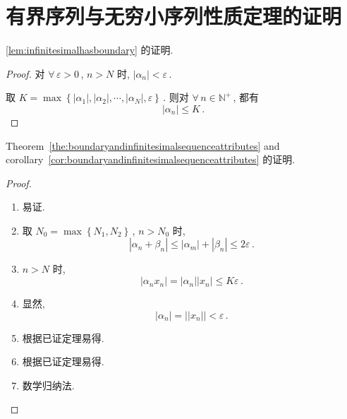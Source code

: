 \documentclass{book}
\newcommand{\Any}{\forall\,}
\newcommand{\set}[1]{\left\{#1\right\}}
\newcommand{\abs}[1]{\left\lvert #1 \right\rvert}
\newcommand{\N}{\mathbb{N}}
\renewcommand{\le}{\leqslant}
\numberwithin{equation}{section}
\numberwithin{figure}{section}
\theoremstyle{definition}
\begin{document}
\section{有界序列与无穷小序列性质定理的证明}
\label{proof:boundaryandinfinitesimalsequenceattributes}
\cref{lem:infinitesimalhasboundary} 的证明.
\begin{proof}
  对 $\Any \varepsilon>0$\,, $n>N$ 时, $\abs{\alpha_n}<\varepsilon$\,.

  取 $K=\max\set{\abs{\alpha_1},\abs{\alpha_2},\cdots,\abs{\alpha_N},\varepsilon}$\,.
  则对 $\Any n\in\N^+$\,, 都有
  \begin{equation*}
    \abs{\alpha_n}\le K\,.
  \end{equation*}
\end{proof}

Theorem~\ref{the:boundaryandinfinitesimalsequenceattributes} and corollary~\ref{cor:boundaryandinfinitesimalsequenceattributes} 的证明.
\begin{proof}
  \leavevmode

  \begin{enumerate}
    \item 易证.
    \item 取 $N_0=\max\set{N_1,N_2}$\,, $n>N_0$ 时,
      \begin{equation*}
	\abs{\alpha_n+\beta_n}\le\abs{\alpha_m}+\abs{\beta_n}\le2\varepsilon\,.
      \end{equation*}
    \item $n>N$ 时,
      \begin{equation*}
	\abs{\alpha_nx_n}=\abs{\alpha_n}\abs{x_n}\le K\varepsilon\,.
      \end{equation*}
    \item 显然,
      \begin{equation*}
	\abs{\alpha_n}=\abs{\abs{x_n}}<\varepsilon\,.
      \end{equation*}
    \item 根据已证定理易得.
    \item 根据已证定理易得.
    \item 数学归纳法.
  \end{enumerate}
\end{proof}
\end{document}

